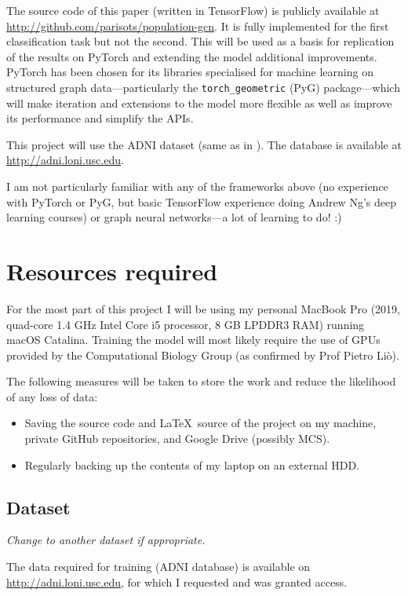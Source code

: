 \documentclass[12pt,a4paper,twoside]{article}
\begin{document}
The source code of this paper (written in TensorFlow) is publicly available at \url{http://github.com/parisots/population-gcn}. It is fully implemented for the first classification task but not the second. This will be used as a basis for replication of the results on PyTorch and extending the model additional improvements. PyTorch has been chosen for its libraries specialised for machine learning on structured graph data—particularly the \texttt{torch\_geometric} (PyG) package—which will make iteration and extensions to the model more flexible as well as improve its performance and simplify the APIs.

This project will use the ADNI dataset (same as in \cite{parisot2017spectral,parisot2018disease}). The database is available at \url{http://adni.loni.usc.edu}.

I am not particularly familiar with any of the frameworks above (no experience with PyTorch or PyG, but basic TensorFlow experience doing Andrew Ng's deep learning courses) or graph neural networks—a lot of learning to do! :)

\section*{Resources required}

For the most part of this project I will be using my personal MacBook Pro (2019, quad-core 1.4 GHz Intel Core i5 processor, 8 GB LPDDR3 RAM) running macOS Catalina. Training the model will most likely require the use of GPUs provided by the Computational Biology Group (as confirmed by Prof Pietro Liò).

The following measures will be taken to store the work and reduce the likelihood of any loss of data: 
\begin{itemize}
  \item Saving the source code and \LaTeX\ source of the project on my machine, private GitHub repositories, and Google Drive (possibly MCS).
  \item Regularly backing up the contents of my laptop on an external HDD.
\end{itemize}

\subsection*{Dataset}
\textit{Change to another dataset if appropriate.}

The data required for training (ADNI database) is available on \url{http://adni.loni.usc.edu}, for which I requested and was granted access.
\end{document}
